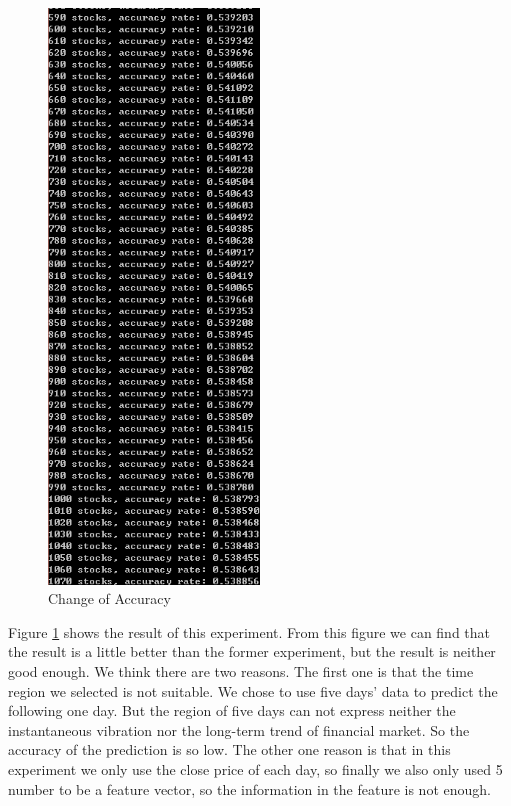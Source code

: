 \begin{figure}
\centering
\includegraphics[width=0.5\textwidth]{accuracy2.png}
\caption{\label{fig:accuracy2}Change of Accuracy}
\end{figure}

Figure \ref{fig:accuracy2} shows the result of this experiment. From this figure we can find that the result is a little better than the former experiment, but the result is neither good enough. We think there are two reasons. The first one is that the time region we selected is not suitable. We chose to use five days' data to predict the following one day. But the region of five days can not express neither the instantaneous vibration nor the long-term trend of financial market. So the accuracy of the prediction is so low. The other one reason is that in this experiment we only use the close price of each day, so finally we also only used 5 number to be a feature vector, so the information in the feature is not enough.


